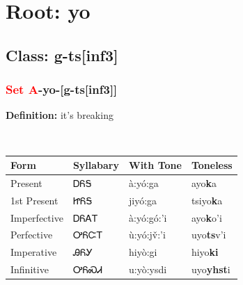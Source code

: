 \needspace{4in}
\section*{Root: yo}
\nopagebreak
{}
\needspace{3in}
\subsection*{Class: g-ts[inf3]}
\nopagebreak
\needspace{2in}
\subsubsection*{\textcolor{Red}{Set A}{-}\textbf{yo}{-}[g-ts[inf3]]}
\nopagebreak
\textbf{Definition: } it{\textquoteright}s breaking
\\[0.5em]
\begin{tabularx}{\textwidth}{l X X X}%
\toprule%
\textbf{Form}&\textbf{Syllabary}&\textbf{With Tone}&\textbf{Toneless}\\%
\midrule%
Present&ᎠᏲᎦ&à:yó:ga&ayo\textbf{k}a\\%
1st Present&ᏥᏲᎦ&jiyó:ga&tsiyo\textbf{k}a\\%
Imperfective&ᎠᏲᎪᎢ&à:yó:gó:’i&ayo\textbf{k}o'i\\%
Perfective&ᎤᏲᏨᎢ&ù:yó:jv̌:’i&uyo\textbf{ts}v'i\\%
Imperative&ᎯᏲᎩ&hiyò:gi&hiyo\textbf{ki}\\%
Infinitive&ᎤᏲᏍᏗ&u:yò:ysdi&uyo\textbf{yhst}i\\%
\bottomrule%
\end{tabularx}
\\[1em]